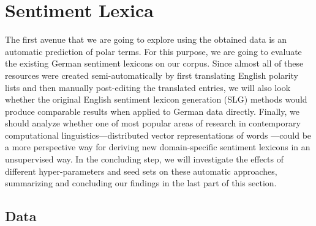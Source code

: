 

\section{Sentiment Lexica}\label{sec:snt:lex}

The first avenue that we are going to explore using the obtained data
is an automatic prediction of polar terms.
For this purpose, we are going to evaluate the existing German
sentiment lexicons on our corpus.  Since almost all of these resources
were created semi-automatically by first translating English polarity
lists and then manually post-editing the translated entries, we will
also look whether the original English sentiment lexicon generation
(SLG) methods would produce comparable results when applied to German
data directly.  Finally, we should analyze whether one of most popular
areas of research in contemporary computational
linguistics---distributed vector representations of words
\cite{Mikolov:13}---could be a more perspective way for deriving new
domain-specific sentiment lexicons in an unsupervised way.  In the
concluding step, we will investigate the effects of different
hyper-parameters and seed sets on these automatic approaches,
summarizing and concluding our findings in the last part of this
section.

\subsection{Data}\label{subsec:snt-lex:data}

